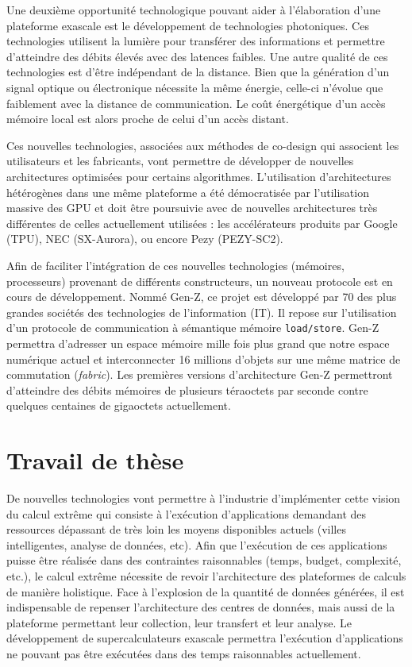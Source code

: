         Une deuxième opportunité technologique pouvant aider à l'élaboration d'une plateforme exascale est le développement de technologies photoniques. Ces technologies utilisent la lumière pour transférer des informations et permettre d'atteindre des débits élevés avec des latences faibles. Une autre qualité de ces technologies est d'être indépendant de la distance. Bien que la génération d'un signal optique ou électronique nécessite la même énergie, celle-ci n'évolue que faiblement avec la distance de communication. Le coût énergétique d'un accès mémoire local est alors proche de celui d'un accès distant. 
        
        Ces nouvelles technologies, associées aux méthodes de co-design qui associent les utilisateurs et les fabricants, vont permettre de développer de nouvelles architectures optimisées pour certains algorithmes.  L'utilisation d'architectures hétérogènes dans une même plateforme a été démocratisée par l'utilisation massive des GPU et doit être poursuivie avec de nouvelles architectures très différentes de celles actuellement utilisées : les accélérateurs produits par Google (TPU), NEC (SX-Aurora), ou encore Pezy (PEZY-SC2). 
        
        Afin de faciliter l'intégration de ces nouvelles technologies (mémoires, processeurs) provenant de différents constructeurs, un nouveau protocole est en cours de développement. Nommé Gen-Z, ce projet est développé par 70 des plus grandes sociétés des technologies de l'information (IT). Il repose sur l'utilisation d'un protocole de communication à sémantique mémoire \verb=load/store=. Gen-Z permettra d'adresser un espace mémoire mille fois plus grand que notre espace numérique actuel et interconnecter 16 millions d'objets sur une même matrice de commutation (\textit{fabric}). Les premières versions d'architecture Gen-Z permettront d'atteindre des débits mémoires de plusieurs téraoctets par seconde contre quelques centaines de gigaoctets actuellement.

\section{Travail de thèse}
    
    
    De nouvelles technologies vont permettre à l'industrie d'implémenter cette vision du calcul extrême qui consiste à l'exécution d'applications demandant des ressources dépassant de très loin les moyens disponibles actuels (villes intelligentes, analyse de données, etc). Afin que l'exécution de ces applications puisse être réalisée dans des contraintes raisonnables (temps, budget, complexité, etc.), le calcul extrême nécessite de revoir l'architecture des plateformes de calculs de manière holistique. Face à l'explosion de la quantité de données générées, il est indispensable de repenser l'architecture des centres de données, mais aussi de la plateforme permettant leur collection, leur transfert et leur analyse. Le développement de supercalculateurs exascale permettra l'exécution d'applications ne pouvant pas être exécutées dans des temps raisonnables actuellement.  



